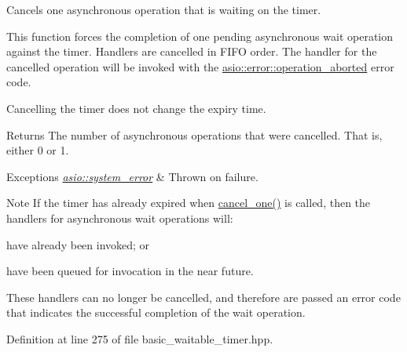 Cancels one asynchronous operation that is waiting on the timer. 

This function forces the completion of one pending asynchronous wait operation against the timer. Handlers are cancelled in F\+I\+F\+O order. The handler for the cancelled operation will be invoked with the \hyperlink{namespaceasio_1_1error_a2a69445eee784059ac2f4a6c4f5fe90dacde6760763051561f6c2ffc4ddf2be1b}{asio\+::error\+::operation\+\_\+aborted} error code.

Cancelling the timer does not change the expiry time.

\begin{DoxyReturn}{Returns}
The number of asynchronous operations that were cancelled. That is, either 0 or 1.
\end{DoxyReturn}

\begin{DoxyExceptions}{Exceptions}
{\em \hyperlink{classasio_1_1system__error}{asio\+::system\+\_\+error}} & Thrown on failure.\\
\hline
\end{DoxyExceptions}
\begin{DoxyNote}{Note}
If the timer has already expired when \hyperlink{classasio_1_1basic__waitable__timer_a84451b4a16cbdd72fd77ed3ddc959524}{cancel\+\_\+one()} is called, then the handlers for asynchronous wait operations will\+:
\end{DoxyNote}
\begin{DoxyItemize}
\item have already been invoked; or\end{DoxyItemize}
\begin{DoxyItemize}
\item have been queued for invocation in the near future.\end{DoxyItemize}
These handlers can no longer be cancelled, and therefore are passed an error code that indicates the successful completion of the wait operation. 

Definition at line 275 of file basic\+\_\+waitable\+\_\+timer.\+hpp.

\hypertarget{classasio_1_1basic__waitable__timer_a5e05cbcbab1e177495c580cea18605bb}{}
